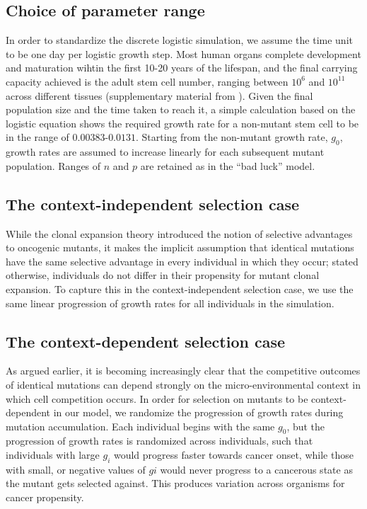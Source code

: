 \documentclass[10pt,twocolumn,twoside]{article}
\begin{document}
	\subsection{Choice of parameter range}
	In order to standardize the discrete logistic simulation, we assume the time unit to be one day per logistic growth step. Most human organs complete development and maturation wihtin the first 10-20 years of the lifespan, and the final carrying capacity achieved is the adult stem cell number, ranging between $10^{6}$ and $10^{11}$ across different tissues (supplementary material from \cite{Tomasetti78}). Given the final population size and the time taken to reach it, a simple calculation based on the logistic equation shows the required growth rate for a non-mutant stem cell to be in the range of $0.00383$-$0.0131$. Starting from the non-mutant growth rate, $g_{0}$, growth rates are assumed to increase linearly for each subsequent mutant population. Ranges of $n$ and $p$ are retained as in the ``bad luck'' model.

	\subsection{The context-independent selection case}
	While the clonal expansion theory introduced the notion of selective advantages to oncogenic mutants, it makes the implicit assumption that identical mutations have the same selective advantage in every individual in which they occur; stated otherwise, individuals do not differ in their propensity for mutant clonal expansion. To capture this in the context-independent selection case, we use the same linear progression of growth rates for all individuals in the simulation.

	\subsection{The context-dependent selection case}
	As argued earlier, it is becoming increasingly clear that the competitive outcomes of identical mutations can depend strongly on the micro-environmental context in which cell competition occurs. In order for selection on mutants to be context-dependent in our model, we randomize the progression of growth rates during mutation accumulation. Each individual begins with the same $g_{0}$, but the progression of growth rates is randomized across individuals, such that individuals with large $g_{i}$ would progress faster towards cancer onset, while those with small, or negative values of $g{i}$ would never progress to a cancerous state as the mutant gets selected against. This produces variation across organisms for cancer propensity.
\end{document}
